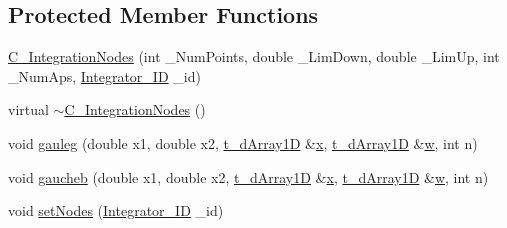 \subsection*{Protected Member Functions}
\begin{DoxyCompactItemize}
\item 
\hyperlink{class_c___integration_nodes_aae608186412f531e84601f7681d9a5ba}{C\-\_\-\-Integration\-Nodes} (int \-\_\-\-Num\-Points, double \-\_\-\-Lim\-Down, double \-\_\-\-Lim\-Up, int \-\_\-\-Num\-Aps, \hyperlink{_integration_nodes_8hpp_a8a2a136fba71c4785a5bdfe3e0e23b2b}{Integrator\-\_\-\-I\-D} \-\_\-id)
\item 
virtual \hyperlink{class_c___integration_nodes_aaba1eab67b07ff7ce5c16667aa9acda3}{$\sim$\-C\-\_\-\-Integration\-Nodes} ()
\item 
void \hyperlink{class_c___integration_nodes_a85fe5a11c29a8c59a75d5497901ca322}{gauleg} (double x1, double x2, \hyperlink{types_8h_a7572e8a35cd6501ce959f177307310a4}{t\-\_\-d\-Array1\-D} \&\hyperlink{class_c___integration_nodes_ac7482a184d19e0ec9bf62a99edd9e29b}{x}, \hyperlink{types_8h_a7572e8a35cd6501ce959f177307310a4}{t\-\_\-d\-Array1\-D} \&\hyperlink{class_c___integration_nodes_a023a6f295be0574aca58f8a67ac6263d}{w}, int n)
\item 
void \hyperlink{class_c___integration_nodes_a551c1c98b67b3def0e59e65e3d515401}{gaucheb} (double x1, double x2, \hyperlink{types_8h_a7572e8a35cd6501ce959f177307310a4}{t\-\_\-d\-Array1\-D} \&\hyperlink{class_c___integration_nodes_ac7482a184d19e0ec9bf62a99edd9e29b}{x}, \hyperlink{types_8h_a7572e8a35cd6501ce959f177307310a4}{t\-\_\-d\-Array1\-D} \&\hyperlink{class_c___integration_nodes_a023a6f295be0574aca58f8a67ac6263d}{w}, int n)
\item 
void \hyperlink{class_c___integration_nodes_ac368475cac1e355e8a4ee4e3354888ae}{set\-Nodes} (\hyperlink{_integration_nodes_8hpp_a8a2a136fba71c4785a5bdfe3e0e23b2b}{Integrator\-\_\-\-I\-D} \-\_\-id)
\end{DoxyCompactItemize}
